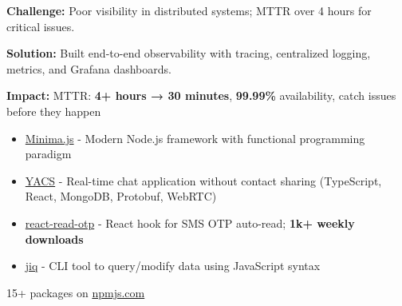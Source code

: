\documentclass[10pt,a4paper,ragged2e,withhyper]{altacv}
\begin{document}
{\small\textbf{Challenge:}} Poor visibility in distributed systems; MTTR over 4 hours for critical issues.

{\small\textbf{Solution:}} Built end-to-end observability with tracing, centralized logging, metrics, and Grafana dashboards.

{\small\textbf{Impact:}} MTTR: \textbf{4+ hours → 30 minutes}, \textbf{99.99\%} availability, catch issues before they happen

\medskip


\begin{itemize}
\item \href{https://minima-js.github.io/}{Minima.js} - Modern Node.js framework with functional programming paradigm
\item \href{https://yacs.in}{YACS} - Real-time chat application without contact sharing (TypeScript, React, MongoDB, Protobuf, WebRTC)
\item \href{https://www.npmjs.com/package/react-read-otp}{react-read-otp} - React hook for SMS OTP auto-read; \textbf{1k+ weekly downloads}
\item \href{https://md-adil.github.io/jiq/}{jiq} - CLI tool to query/modify data using JavaScript syntax
\end{itemize}

\smallskip

15+ packages on \href{https://www.npmjs.com/~adil.sudo}{npmjs.com}

\medskip



\end{document}
